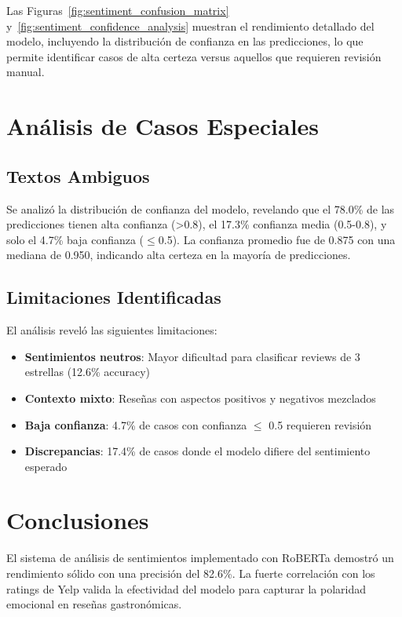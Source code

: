 \documentclass[12pt,a4paper,twoside,openany]{book}
\begin{document}
Las Figuras~\ref{fig:sentiment_confusion_matrix} y~\ref{fig:sentiment_confidence_analysis} muestran el rendimiento detallado del modelo, incluyendo la distribución de confianza en las predicciones, lo que permite identificar casos de alta certeza versus aquellos que requieren revisión manual.

\section{Análisis de Casos Especiales}

\subsection{Textos Ambiguos}

Se analizó la distribución de confianza del modelo, revelando que el 78.0\% de las predicciones tienen alta confianza (>0.8), el 17.3\% confianza media (0.5-0.8), y solo el 4.7\% baja confianza ($\leq$0.5). La confianza promedio fue de 0.875 con una mediana de 0.950, indicando alta certeza en la mayoría de predicciones.

\subsection{Limitaciones Identificadas}

El análisis reveló las siguientes limitaciones:

\begin{itemize}
    \item \textbf{Sentimientos neutros}: Mayor dificultad para clasificar reviews de 3 estrellas (12.6\% accuracy)
    \item \textbf{Contexto mixto}: Reseñas con aspectos positivos y negativos mezclados
    \item \textbf{Baja confianza}: 4.7\% de casos con confianza $\leq$ 0.5 requieren revisión
    \item \textbf{Discrepancias}: 17.4\% de casos donde el modelo difiere del sentimiento esperado
\end{itemize}

\section{Conclusiones}

El sistema de análisis de sentimientos implementado con RoBERTa demostró un rendimiento sólido con una precisión del 82.6\%. La fuerte correlación con los ratings de Yelp valida la efectividad del modelo para capturar la polaridad emocional en reseñas gastronómicas.
\end{document}
